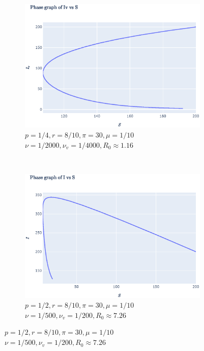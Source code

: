 \documentclass[11pt]{article}
\begin{document}
\begin{figure}[th]
\begin{subfigure}{0.49\textwidth}
	\end{subfigure}
	\begin{subfigure}{0.49\textwidth}
	  \centering
	  \includegraphics[width=\linewidth]{../figures/ex2_IvS_1.eps}  
	  \caption{$p = 1/4,
	  		r = 8/10, 
	  		\pi = 30,
	  		\mu = 1/10 $\\
	  		$\nu = 1/2000,
	  		\nu_v = 1/4000, R_0 \approx 1.16$}
	\end{subfigure}\\
	\begin{subfigure}{0.49\textwidth}
	  \centering
	  \includegraphics[width=\linewidth]{../figures/ex2_IS_2.eps}  
	  \caption{$p = 1/2,
	  		r = 8/10, 
	  		\pi = 30,
	  		\mu = 1/10$\\$
	  		\nu = 1/500,
	  		\nu_v = 1/200, R_0 \approx 7.26$}
	\end{subfigure}

\end{figure}
\end{document}
